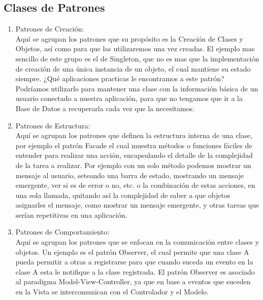 \documentclass[10pt,a4paper]{report}
\begin{document}
\subsection{Clases de Patrones}
\bigskip
\begin{enumerate}

\item {Patrones de Creaci\'{o}n:}\\

Aqu\'{i} se agrupan los patrones que su prop\'{o}sito es la Creaci\'{o}n de Clases y Objetos, as\'{i} como para que las utilizaremos una vez creadas. El ejemplo mas sencillo de este grupo es el de Singleton, que no es mas que la implementaci\'{o}n de creaci\'{o}n de una \'{u}nica instancia de un objeto, el cual mantiene su estado siempre. ¿Qu\'{e} aplicaciones practicas le encontramos a este patr\'{o}n?  Podr\'{i}amos utilizarlo para mantener una clase con la informaci\'{o}n b\'{a}sica de un usuario conectado a nuestra aplicaci\'{o}n, para que no tengamos que ir a la Base de Datos a recuperarla cada vez que la necesitamos.\\

\item {Patrones de Estructura:}\\

Aqu\'{i} se agrupan los patrones que definen la estructura interna de una clase, por ejemplo el patr\'{o}n Facade el cual muestra m\'{e}todos o funciones f\'{a}ciles de entender para realizar una acci\'{o}n, encapsulando el detalle de la complejidad de la tarea a realizar. Por ejemplo con un solo m\'{e}todo podemos mostrar un mensaje al usuario, seteando una barra de estado, mostrando un mensaje emergente, ver si es de error o no, etc. o la combinaci\'{o}n de estas acciones, en una sola llamada, quitando as\'{i} la complejidad de saber a que objetos asignarles el mensaje, como mostrar un mensaje emergente, y otras tareas que ser\'{i}an repetitivas en una aplicaci\'{o}n.\\

\item {Patrones de Comportamiento:}\\

Aqu\'{i} se agrupan los patrones que se enfocan en la comunicaci\'{o}n entre clases y objetos. Un ejemplo es el patr\'{o}n Observer, el cual permite que una clase A pueda permitir a otras a registrarse para que cuando suceda un evento en la clase A esta le notifique a la clase registrada. El patr\'{o}n Observer es asociado al paradigma Model-View-Controller, ya que en base a eventos que suceden en la Vista se intercomunican con el Controlador y el Modelo.\\
\end{enumerate}
\end{document}
